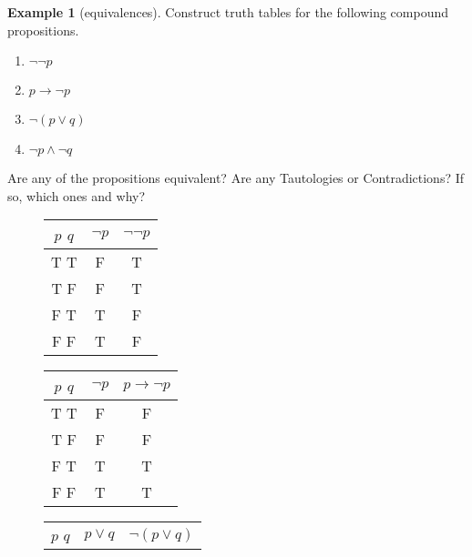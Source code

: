 \documentclass[letterpaper,10pt]{article}
\theoremstyle{plain}
\theoremstyle{definition}
\newtheorem{exmp}[thm]{Example}
\theoremstyle{remark}
\providecommand{\land}{\ensuremath{\wedge}}
\providecommand{\lor}{\ensuremath{\vee}}
\begin{document}
\begin{exmp}[equivalences]

Construct truth tables for the following compound propositions.
  \begin{enumerate}
  \item $\lnot \lnot p $
  \item $p \to \lnot p$
  \item $\lnot (p \lor q)$
  \item $ \lnot p \land \lnot q$
  \end{enumerate}
  
  Are any of the propositions equivalent? 
  Are any Tautologies or Contradictions?
  If so, which ones and why?
  
  

\begin{figure}[htb]
    \begin{minipage}{1.5in}
        \begin{center} 
        \begin{tabular}{ | c | c | c |} 
  \hline
 $p$ $q$ & $ \lnot p$ & $\lnot \lnot p$  \\
 \hline
  T T &F  &T \\ 
  T F & F & T\\ 
  F T & T & F \\ 
  F F &  T& F\\ 
  \hline
\end{tabular}
        \end{center}
    \end{minipage}
    \begin{minipage}{1.5in}
        \begin{center} 
        \begin{tabular}{ | c | c | c |} 
  \hline
 $p$ $q$ & $ \lnot p$ & $p \to \lnot p$  \\
 \hline
  T T & F & F\\ 
  T F & F & F\\ 
  F T & T & T\\ 
  F F & T & T\\ 
  \hline
\end{tabular}
        \end{center}
    \end{minipage}
    \begin{minipage}{1.7in}
        \begin{center}
        \begin{tabular}{ | c | c | c |} 
  \hline
 $p$ $q$ & $p \lor q$ & $\lnot (p \lor q)$ \\

\end{tabular}
\end{center}
\end{minipage}
\end{figure}
\end{exmp}
\end{document}
